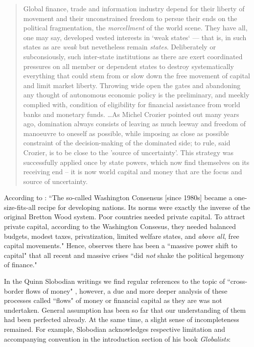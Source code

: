 \begin{quote}
Global finance, trade and information industry depend for their liberty of movement and their unconstrained freedom to persue their ends on the political fragmentation, the \textit{morcellment} of the world scene. They have all, one may say, developed vested interests in `weak states` --- that is, in such states as are \textit{weak} but nevetheless remain \textit{states}. Deliberately or subconsiously, such inter-state institutions as there are exert coordinated pressures on all member or dependent states to destroy systematically everything that could stem from or slow down the free movement of capital and  limit market liberty. Throwing wide open the gates and abandoning any thought of autonomous economic policy is the preliminary, and meekly complied with, condition of eligibility for financial assistance from world banks and monetary funds. \dots As Michel Crozier pointed out many years ago, domination always consists of leaving as much leeway and freedom of manoeuvre to oneself as possible, while imposing as close as possible constraint of the decision-making of the dominated side; to rule, said Crozier, is to be close to the 'source of uncertainty'. This strategy was successfully applied once by state powers, which now find themselves on its receiving end -- it is now world capital and money that are the focus and source of uncertainty. \citep[p.~303, emphasis original]{bauman1998}
\end{quote}

According to \cite[p.~75, emphasis added]{kuttner2018}: ``The so-called Washington Consensus [since 1980s] became a one-size-fits-all recipe for developing nations. Its norms were exactly the inverse of the original Bretton Wood system. Poor countries needed private capital. To attract private capital, according to the Washington Consesus, they needed balanced budgets, modest taxes, privatization, limited welfare states, and \textit{above all}, free capital movements." Hence, \citeauthor{kuttner2018} observes there has been a ``massive power shift to capital" that all recent and massive crises ``did \textit{not} shake the political hegemony of finance."

In the Quinn Slobodian writings we find regular references to the topic of ``cross-border flows of money" \citep{slobodian2018,slobodian2023}, however, a due and more deeper analysis of these processes called ``flows" of money or financial capital as they are was not undertaken.
General assumption has been so far that our understanding of them had been perfected already.
At the same time, a slight sense of incompleteness remained. For example, Slobodian acknowledges respective limitation and accompanying convention in the introduction section of his book \textit{Globalists}:

